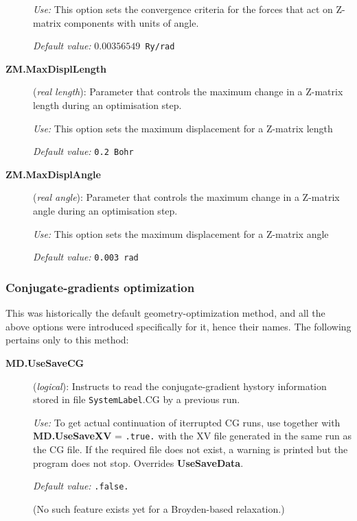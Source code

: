 \begin{description}
\textit{Use:} This option sets the convergence criteria for the forces that
act on Z-matrix components with units of angle.

\textit{Default value:} \texttt{$0.00356549$ Ry/rad}

\item[\textbf{ZM.MaxDisplLength}] (\textit{real length}):
   Parameter that
  controls the maximum change in a Z-matrix length during an
  optimisation step.

\textit{Use:} This option sets the maximum displacement for a Z-matrix length

\textit{Default value:} \texttt{0.2 Bohr}

\item[\textbf{ZM.MaxDisplAngle}] (\textit{real angle}):
   Parameter that
  controls the maximum change in a Z-matrix angle during an
  optimisation step.

\textit{Use:} This option sets the maximum displacement for a Z-matrix angle

\textit{Default value:} \texttt{0.003 rad }

\end{description}

\subsubsection{Conjugate-gradients optimization}

This was historically the default geometry-optimization method, and
all the above options were introduced specifically for it, hence their
names. The following pertains only to this method:

\begin{description}
\item[\textbf{MD.UseSaveCG}] (\textit{logical}):
Instructs to read the conjugate-gradient hystory information stored
in file \texttt{SystemLabel}.CG by a previous run.

\textit{Use:} To get actual continuation of iterrupted CG runs, use
together with \textbf{MD.UseSaveXV} = \texttt{.true.} with the XV
file generated in the same run as the CG file.
If the required file does not exist, a warning is
printed but the program does not stop. Overrides \textbf{UseSaveData}.

\textit{Default value:} \texttt{.false.}

(No such feature exists yet for a Broyden-based relaxation.)

\end{description}

